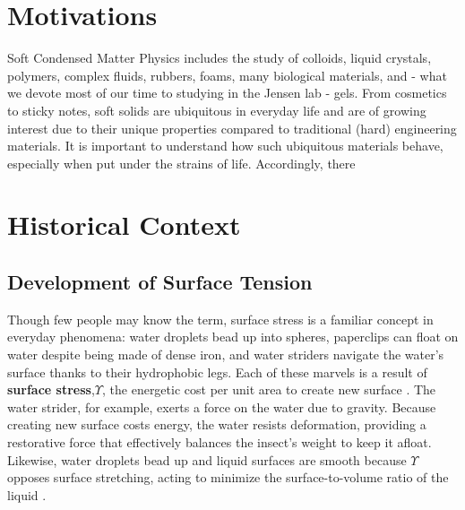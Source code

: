 

\section{Motivations}
Soft Condensed Matter Physics includes the study of colloids, liquid crystals, polymers, complex fluids, rubbers, foams, many biological materials, and - what we devote most of our time to studying in the Jensen lab - gels. From cosmetics to sticky notes, soft solids are ubiquitous in everyday life and are of growing interest due to their unique properties compared to traditional (hard) engineering materials. It is important to understand how such ubiquitous materials behave, especially when put under the strains of life. Accordingly, there 
 
 
 
\section{Historical Context}
\subsection{Development of Surface Tension}
Though few people may know the term, surface stress is a familiar concept in everyday phenomena: water droplets bead up into spheres, paperclips can float on water despite being made of dense iron, and water striders navigate the water's surface thanks to their hydrophobic legs. Each of these marvels is a result of \textbf{surface stress},$\Upsilon$, the  energetic cost per unit area to create new surface \cite{cammarata1994surface}. The water strider, for example, exerts a force on the water due to gravity. Because creating new surface costs energy, the water resists deformation, providing a restorative force that effectively balances the insect’s weight to keep it afloat. Likewise, water droplets bead up and liquid surfaces are smooth because $\Upsilon$ opposes surface stretching, acting to minimize the surface-to-volume ratio of the liquid \cite{gibbs1906scientific,GennesPierre-Gillesde2003Cawp} .

